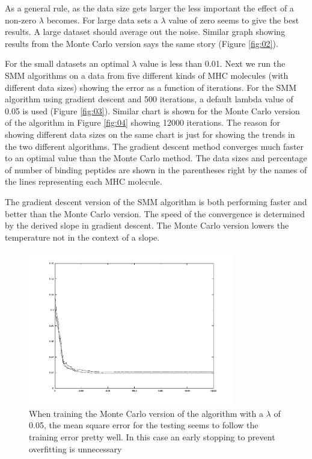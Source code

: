 \documentclass{bioinfo}
\begin{document}
\begin{application}
\par As a general rule, as the data size gets larger the less important the effect of a non-zero $\lambda$ becomes. For large data sets a $\lambda$ value of zero seems to give the best results. A large dataset should average out the noise. Similar graph showing results from the Monte Carlo version says the same story (Figure \ref{fig:02}).
\par For the small datasets an optimal $\lambda$ value is  less than 0.01. Next we run the SMM algorithms on a data from five different kinds of MHC molecules (with different data sizes) showing the error as a function of iterations. For the SMM algorithm using gradient descent and 500 iterations, a default lambda value of 0.05 is used (Figure \ref{fig:03}). Similar chart is shown for the Monte Carlo version of the algorithm in Figure \ref{fig:04} showing 12000 iterations. The reason for showing different data sizes on the same chart is just for showing the trends in the two different algorithms. The gradient descent method converges much faster to an optimal value than the Monte Carlo method. The data sizes and percentage of number of binding peptides are shown in the parentheses right by the names of the lines representing each MHC molecule.

\par The gradient descent version of the SMM algorithm is both performing faster and better than the Monte Carlo version. The speed of the convergence is determined by the derived slope in gradient descent. The Monte Carlo version lowers the temperature not in the context of a slope.
\begin{figure}[!tpb]
\centerline{\includegraphics[width=9cm]{fig/overfitting_not.png}}
\caption{When training the Monte Carlo version of the algorithm with a $\lambda$ of 0.05, the mean square error for the testing seems to follow the training error pretty well. In this case an early stopping to prevent overfitting is unnecessary}
\label{fig:05}
\end{figure}


\end{application}
\end{document}
